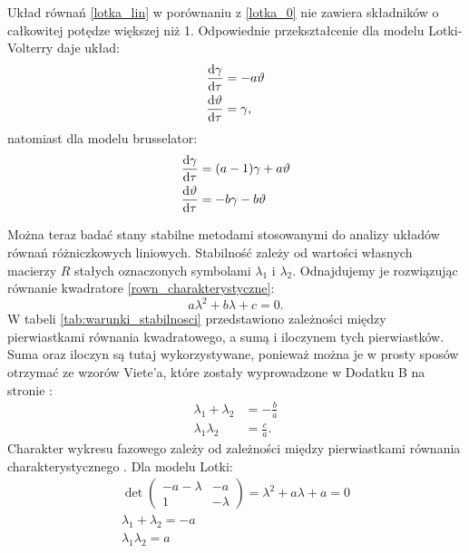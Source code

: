 \documentclass[10pt, a4paper, twoside, onecolumn]{article}
\numberwithin{equation}{section}
\begin{document}
	Układ równań \eqref{lotka_lin} w porównaniu z \eqref{lotka_0} nie zawiera składników o całkowitej potędze większej niż 1. Odpowiednie przekształcenie dla modelu Lotki-Volterry daje układ:
	\begin{equation}\label{lotka_volterra_lin}
	\begin{split}
		\dv{\gamma}{\tau} &= -a\vartheta \\
		\dv{\vartheta}{\tau} &= \gamma,
	\end{split}
	\end{equation}
	natomiast dla modelu brusselator:
	\begin{equation}\label{bruskelator_lin}
	\begin{split}
		\dv{\gamma}{\tau} &= (a-1)\gamma+a\vartheta \\
		\dv{\vartheta}{\tau} &= -b\gamma-b\vartheta
	\end{split}
	\end{equation}\par
	Można teraz badać stany stabilne metodami stosowanymi do analizy układów równań różniczkowych liniowych. Stabilność zależy od wartości własnych macierzy $R$ stałych oznaczonych symbolami \(\lambda_{1}\) i \(\lambda_{2}\). Odnajdujemy je rozwiązując równanie kwadratore \eqref{rown_charakterystyczne}:
	\begin{equation}\label{rown_charakterystyczne}
		a\lambda^{2} + b\lambda + c = 0.
	\end{equation}
	W tabeli \ref{tab:warunki_stabilnosci} przedstawiono zależności między pierwiastkami równania kwadratowego, a sumą i iloczynem tych pierwiastków. Suma oraz iloczyn są tutaj wykorzystywane, ponieważ można je w prosty sposów otrzymać ze wzorów Viete'a, które zostały wyprowadzone w Dodatku B na stronie \pageref{sec: dodatek B}: 
	\begin{equation}
	\begin{split}
		\lambda_{1} + \lambda_{2} &= -\frac{b}{a} \\
		\lambda_{1}\lambda_{2} &= \frac{c}{a}.
	\end{split}
	\end{equation}
	Charakter wykresu fazowego zależy od zależności między pierwiastkami równania charakterystycznego \cite{orlik}.
	Dla modelu Lotki:
	\begin{equation}\label{lotka_charakterystyczne}
	\begin{split}
		\det
		\begin{pmatrix}
			-a-\lambda & -a \\
			1 & -\lambda
		\end{pmatrix}
		=\lambda^{2}+a\lambda+a=0 \\
		\lambda_{1}+\lambda_{2}=-a \\
		\lambda_{1}\lambda_{2}=a
	\end{split}
	\end{equation}
\end{document}
